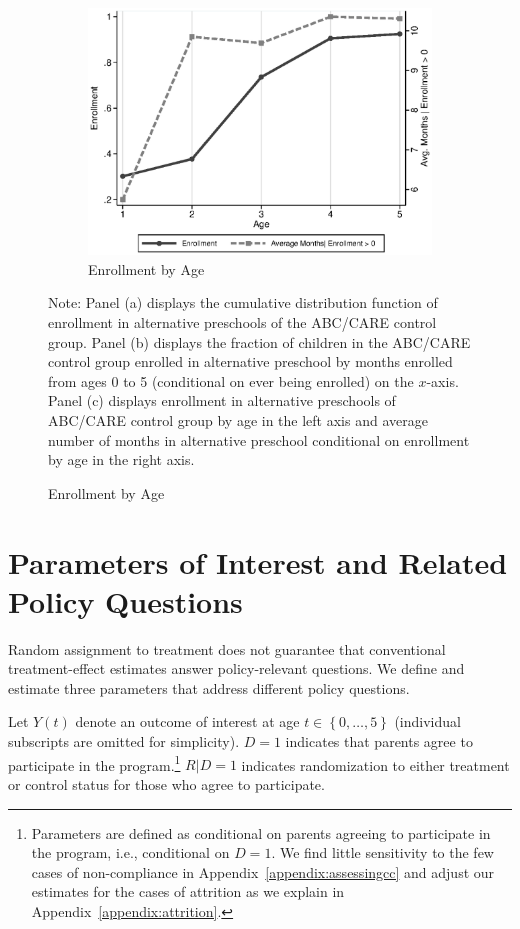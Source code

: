 \begin{figure}
\begin{subfigure}[h]{0.4\textwidth}
	\centering
	\caption{Enrollment by Age} \label{fig:salmonella}
		\includegraphics[width=\textwidth]{output/abccare_Valtenrollment.eps}
\end{subfigure}

\footnotesize \justify
Note: Panel (a) displays the cumulative distribution function of enrollment in alternative preschools of the ABC/CARE control group. Panel (b) displays the fraction of children in the ABC/CARE control group enrolled in alternative preschool by months enrolled from ages 0 to 5 (conditional on ever being enrolled) on the $x$-axis. Panel (c) displays enrollment in alternative preschools of ABC/CARE control group by age in the left axis and average number of months in alternative preschool conditional on enrollment by age in the right axis.\\
\end{figure}

\section{Parameters of Interest and Related Policy Questions} \label{section:methodsquestions}

Random assignment to treatment does not guarantee that conventional treatment-effect estimates answer policy-relevant questions. We define and estimate three parameters that address different policy questions.

Let $Y(t)$ denote an outcome of interest at age $t \in \left\{ 0,\dots,5 \right\}$ (individual subscripts are omitted for simplicity). $D=1$ indicates that parents agree to participate in the program.\footnote{Parameters are defined as conditional on parents agreeing to participate in the program, i.e., conditional on $D = 1$. We find little sensitivity to the few cases of non-compliance in Appendix~\ref{appendix:assessingcc} and adjust our estimates for the cases of attrition as we explain in Appendix~\ref{appendix:attrition}.} $R | D = 1$ indicates randomization to either treatment or control status for those who agree to participate.

